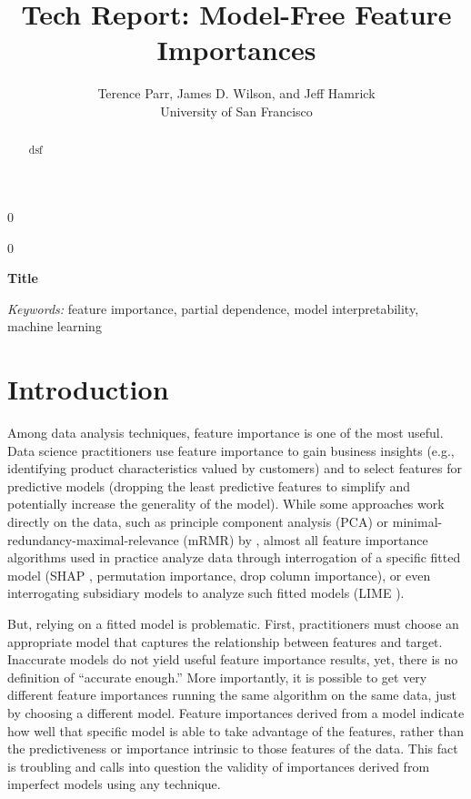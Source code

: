 \documentclass[12pt]{article}
\newcommand{\blind}{0}
\newcommand{\todo}[1]{{{\color{red}{[#1]}}}}
\begin{document}
\def\spacingset#1{\renewcommand{\baselinestretch}%
{#1}\small\normalsize} \spacingset{1}



\blind
{
  \title{\bf Tech Report: Model-Free Feature Importances}

  \author{Terence Parr, James D. Wilson, and Jeff Hamrick\\
      University of San Francisco\\
}
  \maketitle
} \fi

\blind
{
  \bigskip
  \bigskip
  \bigskip
  \begin{center}
    {\LARGE\bf Title}
\end{center}
  \medskip
} \fi

\bigskip
\begin{abstract}
dsf
\end{abstract}

\noindent%
{\it Keywords:} feature importance, partial dependence, model interpretability, machine learning

\section{Introduction}
\label{sec:intro}

\todo{wrapper vs filter methods}

Among data analysis techniques, feature importance is one of the most  useful. Data science practitioners use feature importance to gain business insights (e.g., identifying product characteristics valued by customers) and to select features for predictive models (dropping the least predictive features to simplify and potentially increase the generality of the model). While some approaches work directly on the data, such as principle component analysis (PCA) or minimal-redundancy-maximal-relevance (mRMR) by \cite{mRMR}, almost all feature importance algorithms used in practice analyze data through interrogation of a specific  fitted model (SHAP \cite{shap}, permutation importance, drop column importance), or even interrogating subsidiary models to analyze such fitted models (LIME \cite{lime}).

But, relying on a fitted model is problematic. First, practitioners must choose an appropriate model that captures the relationship between features and target. Inaccurate models do not yield useful feature importance results, yet, there is no definition of ``accurate enough.'' More importantly, it is possible to get very different feature importances running the same algorithm on the same data, just by choosing a different model. Feature importances derived from a model indicate how well that specific model is able to take advantage of the features, rather than the predictiveness or importance intrinsic to those features of the data.  This fact is troubling and calls into question the validity of importances derived from imperfect models using any technique.  
\end{document}
